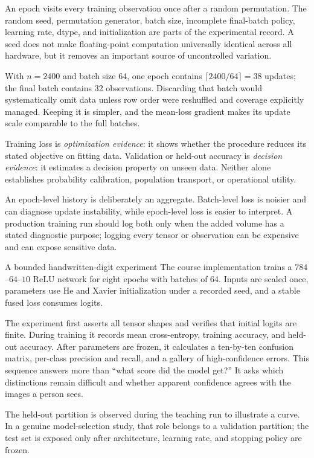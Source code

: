 An epoch visits every training observation once after a random permutation.
The random seed, permutation generator, batch size, incomplete final-batch
policy, learning rate, dtype, and initialization are parts of the experimental
record. A seed does not make floating-point computation universally identical
across all hardware, but it removes an important source of uncontrolled
variation.

With $n=2400$ and batch size 64, one epoch contains
$\lceil2400/64\rceil=38$ updates; the final batch contains 32 observations.
Discarding that batch would systematically omit data unless row order were
reshuffled and coverage explicitly managed. Keeping it is simpler, and the
mean-loss gradient makes its update scale comparable to the full batches.

Training loss is \emph{optimization evidence}: it shows whether the procedure
reduces its stated objective on fitting data. Validation or held-out accuracy
is \emph{decision evidence}: it estimates a decision property on unseen data.
Neither alone establishes probability calibration, population transport, or
operational utility.

An epoch-level history is deliberately an aggregate. Batch-level loss is
noisier and can diagnose update instability, while epoch-level loss is easier
to interpret. A production training run should log both only when the added
volume has a stated diagnostic purpose; logging every tensor or observation
can be expensive and can expose sensitive data.

\begin{workedexample}{A bounded handwritten-digit experiment}
The course implementation trains a $784$--$64$--$10$ ReLU network for eight
epochs with batches of 64. Inputs are scaled once, parameters use He and Xavier
initialization under a recorded seed, and a stable fused loss consumes logits.

The experiment first asserts all tensor shapes and verifies that initial
logits are finite. During training it records mean cross-entropy, training
accuracy, and held-out accuracy. After parameters are frozen, it calculates a
ten-by-ten confusion matrix, per-class precision and recall, and a gallery of
high-confidence errors. This sequence answers more than ``what score did the
model get?'' It asks which distinctions remain difficult and whether apparent
confidence agrees with the images a person sees.

The held-out partition is observed during the teaching run to illustrate a
curve. In a genuine model-selection study, that role belongs to a validation
partition; the test set is exposed only after architecture, learning rate, and
stopping policy are frozen.
\end{workedexample}

